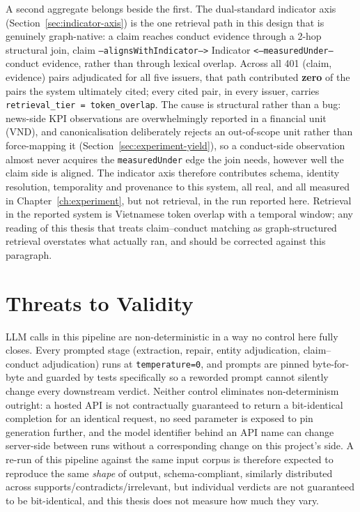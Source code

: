 \documentclass[fontsize=12pt,oneside,headings=small]{scrreprt}
\begin{document}
A second aggregate belongs beside the first. The dual-standard indicator axis (Section~\ref{sec:indicator-axis}) is the one retrieval path in this design that is genuinely graph-native: a claim reaches conduct evidence through a 2-hop structural join, \textsf{claim} \texttt{--alignsWithIndicator-->} \textsf{Indicator} \texttt{<--measuredUnder--} \textsf{conduct evidence}, rather than through lexical overlap. Across all 401 (claim, evidence) pairs adjudicated for all five issuers, that path contributed \textbf{zero} of the pairs the system ultimately cited; every cited pair, in every issuer, carries \texttt{retrieval\_tier = token\_overlap}. The cause is structural rather than a bug: news-side KPI observations are overwhelmingly reported in a financial unit (VND), and canonicalisation deliberately rejects an out-of-scope unit rather than force-mapping it (Section~\ref{sec:experiment-yield}), so a conduct-side observation almost never acquires the \texttt{measuredUnder} edge the join needs, however well the claim side is aligned. The indicator axis therefore contributes schema, identity resolution, temporality and provenance to this system, all real, and all measured in Chapter~\ref{ch:experiment}, but not retrieval, in the run reported here. Retrieval in the reported system is Vietnamese token overlap with a temporal window; any reading of this thesis that treats claim--conduct matching as graph-structured retrieval overstates what actually ran, and should be corrected against this paragraph.

\section{Threats to Validity}
\label{sec:discussion-threats}

LLM calls in this pipeline are non-deterministic in a way no control here fully closes. Every prompted stage (extraction, repair, entity adjudication, claim--conduct adjudication) runs at \texttt{temperature=0}, and prompts are pinned byte-for-byte and guarded by tests specifically so a reworded prompt cannot silently change every downstream verdict. Neither control eliminates non-determinism outright: a hosted API is not contractually guaranteed to return a bit-identical completion for an identical request, no seed parameter is exposed to pin generation further, and the model identifier behind an API name can change server-side between runs without a corresponding change on this project's side. A re-run of this pipeline against the same input corpus is therefore expected to reproduce the same \emph{shape} of output, schema-compliant, similarly distributed across supports/contradicts/irrelevant, but individual verdicts are not guaranteed to be bit-identical, and this thesis does not measure how much they vary.
\end{document}
